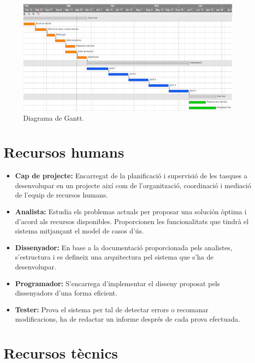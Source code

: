 \begin{figure}[!h]
\centering
\includegraphics[scale=0.65]{Figures/Gantt.jpg}
\caption{Diagrama de Gantt.}
\end{figure}

\section{Recursos humans}

\begin{itemize}

\item{}\textbf{Cap de projecte:} Encarregat de la planificació i supervisió de les tasques a desenvolupar en un projecte així com de l’organització, coordinació i mediació de l’equip de recursos humans.
\item{}\textbf{Analista:} Estudia els problemas actuals per proposar una solución òptima i d’acord als recursos disponibles. Proporcionen les funcionalitats que tindrà el sistema mitjançant el model de casos d’ús.
\item{}\textbf{Dissenyador:} En base a la documentació proporcionada pels analistes, s’estructura i es defineix una arquitectura pel sistema que s’ha de desenvolupar. 
\item{}\textbf{Programador:} S’encarrega d’implementar el disseny proposat pels dissenyadors d’una forma eficient.
\item{}\textbf{Tester:} Prova el sistema per tal de detectar errors o recomanar modificacions, ha de redactar un informe després de cada prova efectuada.
\end{itemize}

\clearpage

\section{Recursos tècnics}

